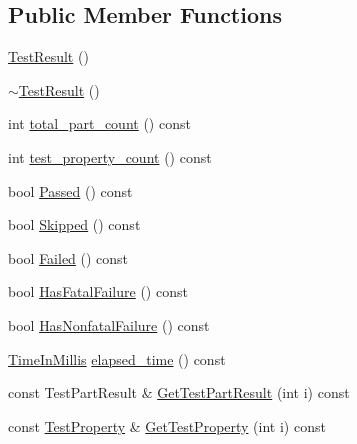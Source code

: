 \subsection*{Public Member Functions}
\begin{DoxyCompactItemize}
\item 
\hyperlink{classtesting_1_1TestResult_a5cf5dd6f416b7334ea601aab21a2fda5}{Test\+Result} ()
\item 
\hyperlink{classtesting_1_1TestResult_a41f407680b725b75d7eadc3230bc3315}{$\sim$\+Test\+Result} ()
\item 
int \hyperlink{classtesting_1_1TestResult_a6174aa4019dcda7c34d776b5741c9032}{total\+\_\+part\+\_\+count} () const
\item 
int \hyperlink{classtesting_1_1TestResult_afe4523257bbea8bc63b0950b702790be}{test\+\_\+property\+\_\+count} () const
\item 
bool \hyperlink{classtesting_1_1TestResult_acf7e6e72f05a0545c48ea48e7f8851df}{Passed} () const
\item 
bool \hyperlink{classtesting_1_1TestResult_a4c9e954e0f8c1386206f2e6208c45244}{Skipped} () const
\item 
bool \hyperlink{classtesting_1_1TestResult_afacc37e8b43c8574e4101bc61723c769}{Failed} () const
\item 
bool \hyperlink{classtesting_1_1TestResult_a30e00d4076ae07fb5ad7b623d9dc1fe4}{Has\+Fatal\+Failure} () const
\item 
bool \hyperlink{classtesting_1_1TestResult_a510564fa67b485ed4589a259f2a032d6}{Has\+Nonfatal\+Failure} () const
\item 
\hyperlink{namespacetesting_a992de1d091ce660f451d1e8b3ce30fd6}{Time\+In\+Millis} \hyperlink{classtesting_1_1TestResult_a717e05e00d4af5cb809433e343ab63af}{elapsed\+\_\+time} () const
\item 
const Test\+Part\+Result \& \hyperlink{classtesting_1_1TestResult_a910b410d0d1e066cd9e182f9e07d1933}{Get\+Test\+Part\+Result} (int i) const
\item 
const \hyperlink{classtesting_1_1TestProperty}{Test\+Property} \& \hyperlink{classtesting_1_1TestResult_a491ede3939a9ca508e338929762cb148}{Get\+Test\+Property} (int i) const
\end{DoxyCompactItemize}
